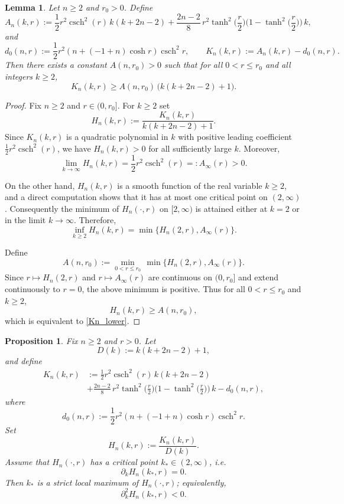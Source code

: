 \documentclass[11pt]{amsart}
\newtheorem{lemma}[theorem]{Lemma}
\newtheorem{proposition}[theorem]{Proposition}
\newcommand{\csch}{\operatorname{csch}}
\numberwithin{equation}{section}
\def\ge{\geqslant}
\begin{document}
\begin{lemma}\label{lem:Anr0}
Let $n\ge 2$ and $r_0>0$. Define
\[
A_n(k,r):=
\frac12 r^2\csch^2(r)\,k(k+2n-2)
+\frac{2n-2}{8}\, r^2 \tanh^2\!\Big(\frac r2\Big)
\Big(1-\tanh^2\!\Big(\frac r2\Big)\Big)\,k,
\]
and
\[
d_0(n,r):=\frac{1}{2}r^{2}\left(n+(-1+n)\cosh r\right)\csch^{2}r,
\qquad
K_n(k,r):=A_n(k,r)-d_0(n,r).
\]
Then there exists a constant $A(n,r_0)>0$ such that for all $0<r\le r_0$ and all integers $k\ge 2$,
\begin{equation}\label{Kn_lower}
K_n(k,r)\ge A(n,r_0)\,\big(k(k+2n-2)+1\big).
\end{equation}
\end{lemma}
\begin{proof}
Fix $n\ge 2$ and $r\in(0,r_0]$. For $k\ge 2$ set
\[
H_n(k,r):=\frac{K_n(k,r)}{k(k+2n-2)+1}.
\]
Since $K_n(k,r)$ is a quadratic polynomial in $k$ with positive leading coefficient
$\frac12 r^2\csch^2(r)$, we have $H_n(k,r)>0$ for all sufficiently large $k$.
Moreover,
\[
\lim_{k\to\infty}H_n(k,r)
=\frac12 r^2\csch^2(r)=:A_\infty(r)>0.
\]

On the other hand, $H_n(k,r)$ is a smooth function of the real variable $k\ge 2$,
and a direct computation shows that it has at most one critical point on $(2,\infty)$.
Consequently the minimum of $H_n(\cdot,r)$ on $[2,\infty)$ is attained either at $k=2$
or in the limit $k\to\infty$. Therefore,
\[
\inf_{k\ge 2}H_n(k,r)=\min\{H_n(2,r),A_\infty(r)\}.
\]

Define
\[
A(n,r_0):=\min_{0<r\le r_0}\,\min\{H_n(2,r),A_\infty(r)\}.
\]
Since $r\mapsto H_n(2,r)$ and $r\mapsto A_\infty(r)$ are continuous on $(0,r_0]$
and extend continuously to $r=0$, the above minimum is positive.
Thus for all $0<r\le r_0$ and $k\ge 2$,
\[
H_n(k,r)\ge A(n,r_0),
\]
which is equivalent to \eqref{Kn_lower}.
\end{proof}

\begin{proposition}\label{prop:Hn_max}
Fix $n\ge 2$ and $r>0$. Let
\[
D(k):=k(k+2n-2)+1,
\]
and define
\[\begin{split}
K_n(k,r)&:=
\frac12 r^2\csch^2(r)\,k(k+2n-2)
\\&+\frac{2n-2}{8}\,r^2\tanh^2\!\Big(\frac r2\Big)\Big(1-\tanh^2\!\Big(\frac r2\Big)\Big)\,k
-d_0(n,r),\end{split}
\]
where
\[
d_0(n,r):=\frac{1}{2}r^{2}\left(n+(-1+n)\cosh r\right)\csch^{2}r
.
\]
Set
\[
H_n(k,r):=\frac{K_n(k,r)}{D(k)}.
\]
Assume that $H_n(\cdot,r)$ has a critical point $k_\ast\in(2,\infty)$, i.e.
\[
\partial_k H_n(k_\ast,r)=0.
\]
Then $k_\ast$ is a strict local maximum of $H_n(\cdot,r)$; equivalently,
\[
\partial_k^2 H_n(k_\ast,r)<0.
\]
\end{proposition}
\end{document}
